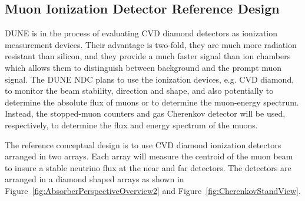 %
%


%
%
\subsection{Muon Ionization Detector Reference Design}
\label{sec:detectors-nd-blm-muon-ionization}

DUNE is in the process of evaluating CVD diamond detectors
as ionization measurement devices. Their advantage is two-fold, they are much more
radiation resistant than silicon, and they provide a much faster signal than ion chambers
which allows them to distinguish between background and the prompt muon signal. 
The DUNE NDC plans to use the ionization devices, e.g. CVD diamond, to monitor
the beam stability, direction and shape, 
and also potentially to determine the absolute flux of muons or to determine the 
muon-energy spectrum. Instead, the stopped-muon counters %
and gas Cherenkov detector %
will be used, respectively, to determine the flux and energy
spectrum of the muons. 

The reference conceptual design is to use CVD diamond ionization detectors arranged in two
arrays. Each array will measure the centroid of the muon beam to insure a stable neutrino flux
at the near and far detectors. The detectors are arranged in a diamond shaped arrays as shown in 
Figure~\ref{fig:AbsorberPerspectiveOverview2} and Figure~\ref{fig:CherenkovStandView}.

